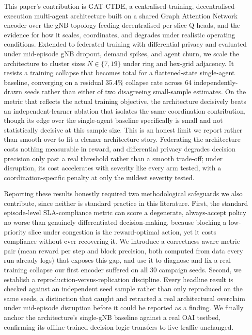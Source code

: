 \documentclass[pdflatex,sn-basic,Numbered]{sn-jnl}%
\begin{document}
This paper's contribution is GAT-CTDE, a centralised-training,
decentralised-execution multi-agent architecture built on a shared
Graph Attention Network~\cite{gat} encoder over the gNB topology
feeding decentralised per-slice Q-heads, and the evidence for how it
scales, coordinates, and degrades under realistic operating
conditions. Extended to federated training with differential privacy and evaluated under mid-episode gNB dropout, demand spikes, and agent churn, we scale the architecture to cluster sizes $N \in \{7, 19\}$ under ring and hex-grid adjacency. It resists a training collapse that becomes total for a flattened-state single-agent baseline, converging on a residual 35.4\% collapse rate across 64 independently-drawn seeds rather than either of two disagreeing small-sample estimates. On the metric that reflects the actual training objective, the architecture decisively beats an independent-learner ablation that isolates the same coordination contribution, though its edge over the single-agent baseline specifically is small and not statistically decisive at this sample size. This is an honest limit we report rather than smooth over to fit a cleaner architecture story. Federating the architecture costs nothing
measurable in reward, and differential privacy degrades decision
precision only past a real threshold rather than a smooth trade-off;
under disruption, its cost accelerates with severity like every arm
tested, with a coordination-specific penalty at only the mildest
severity tested.

Reporting these results honestly required two methodological
safeguards we also contribute, since neither is standard practice in
this literature. First, the standard episode-level SLA-compliance metric can score a degenerate, always-accept policy no worse than genuinely differentiated decision-making, because blocking a low-priority slice under congestion is the reward-optimal action, yet it costs compliance without ever recovering it. We introduce a correctness-aware metric pair (mean reward per step and block precision, both computed from data every run already logs) that exposes this gap, and use it to diagnose and fix a real training collapse our first encoder suffered on all 30 campaign seeds. Second, we establish a reproduction-versus-replication discipline. Every headline result is checked against an independent seed sample rather than only reproduced on the same seeds, a distinction that caught and retracted a real architectural overclaim under mid-episode disruption before it could be reported as a finding. We finally anchor the architecture's
single-gNB baseline against a real OAI testbed, confirming its
offline-trained decision logic transfers to live traffic unchanged.
\end{document}

